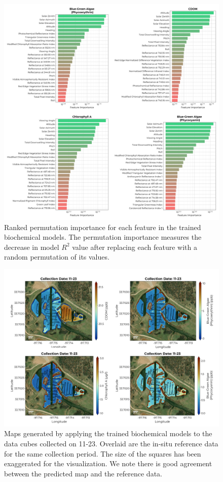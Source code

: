 \documentclass[remotesensing,article,submit,pdftex,moreauthors]{Definitions/mdpi}
\begin{document}
\begin{figure}[t!]
\centering
\vspace{-0.3in}
\includegraphics[width=0.9\columnwidth]{paper/figures/results/fits/biochemical-ranking.pdf}
\vspace{-0.15in}
\caption{Ranked permutation importance for each feature in the trained biochemical models. The permutation importance measures the decrease in model $R^2$ value after replacing each feature with a random permutation of its values.\label{fig:biochem-fi}}
\end{figure}  

\begin{figure}[b!]
\centering
\vspace{-0.35in}
\includegraphics[width=0.92\columnwidth]{paper/figures/results/maps/biochemical.pdf}
\vspace{-0.15in}
\caption{Maps generated by applying the trained biochemical models to the data cubes collected on 11-23. Overlaid are the in-situ reference data for the same collection period. The size of the squares has been exaggerated for the visualization. We note there is good agreement between the predicted map and the reference data. \label{fig:map-biochem}}
\end{figure}  
\end{document}
